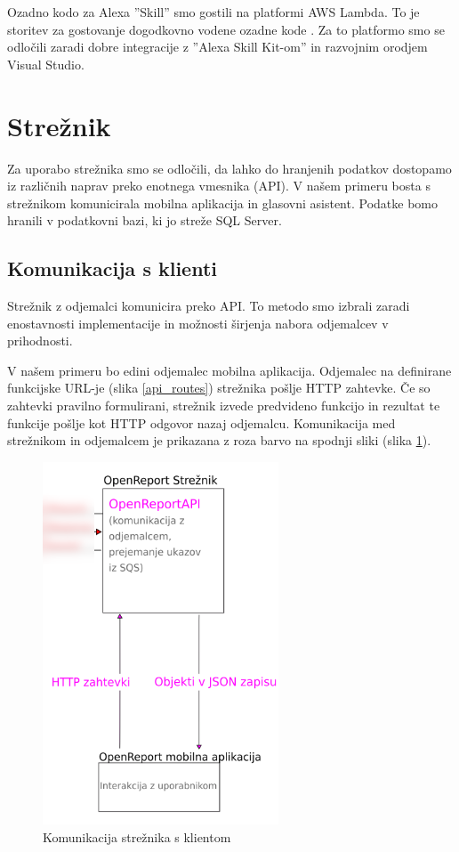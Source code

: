 \documentclass[a4paper, 12pt]{book}
\begin{document}
Ozadno kodo za Alexa ''Skill'' smo gostili na platformi AWS Lambda.
To je storitev za gostovanje dogodkovno vodene ozadne kode \cite{lambda}.
Za to platformo smo se odločili zaradi dobre integracije z ''Alexa Skill Kit-om'' in razvojnim orodjem Visual Studio.

\section{Strežnik}

Za uporabo strežnika smo se odločili, da lahko do hranjenih podatkov dostopamo iz različnih naprav preko enotnega vmesnika (API).
V našem primeru bosta s strežnikom komunicirala mobilna aplikacija in glasovni asistent.
Podatke bomo hranili v podatkovni bazi, ki jo streže SQL Server.

\subsection{Komunikacija s klienti}

Strežnik z odjemalci komunicira preko API.
To metodo smo izbrali zaradi enostavnosti implementacije in možnosti širjenja nabora odjemalcev v prihodnosti.

V našem primeru bo edini odjemalec mobilna aplikacija.
Odjemalec na definirane funkcijske URL-je (slika \ref{api_routes}) strežnika pošlje HTTP zahtevke.
Če so zahtevki pravilno formulirani, strežnik izvede predvideno funkcijo in rezultat te funkcije pošlje kot HTTP odgovor nazaj odjemalcu.
Komunikacija med strežnikom in odjemalcem je prikazana z roza barvo na spodnji sliki (slika \ref{plan_server_client}).

\begin{figure}[H]
\begin{center}
\includegraphics[width=7cm]{plan_server_client}
\end{center}
\caption{Komunikacija strežnika s klientom}
\label{plan_server_client}
\end{figure}
\end{document}
